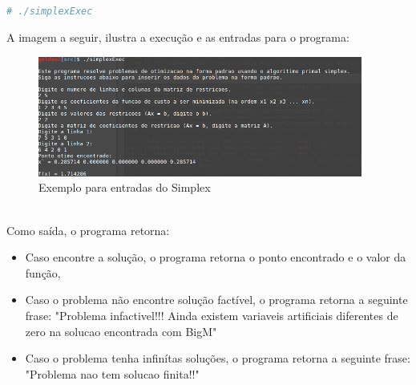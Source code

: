 \documentclass[a4paper]{article}
\begin{document}
\\
\begin{lstlisting}[language=bash]
  # ./simplexExec 
\end{lstlisting}
A imagem a seguir, ilustra a execu\c{c}\~ao e as entradas para o programa:
\begin{figure}[h]
\caption{Exemplo para entradas do Simplex}
\includegraphics[width=0.95\textwidth]{simplexEntradas.png}
\end{figure}
\\
Como sa\'ida, o programa retorna:
\begin{itemize}
\item Caso encontre a solu\c{c}\~ao, o programa retorna o ponto encontrado e o valor da fun\c{c}\~ao,
\item Caso o problema n\~ao encontre solu\c{c}\~ao fact\'ivel, o programa retorna a seguinte frase: "Problema infactivel!!! Ainda existem variaveis artificiais diferentes de zero na solucao encontrada com BigM"
\\
\item Caso o problema tenha infin\'itas solu\c{c}\~oes, o programa retorna a seguinte frase: "Problema nao tem solucao finita!!"
\end{itemize}
\end{document}
